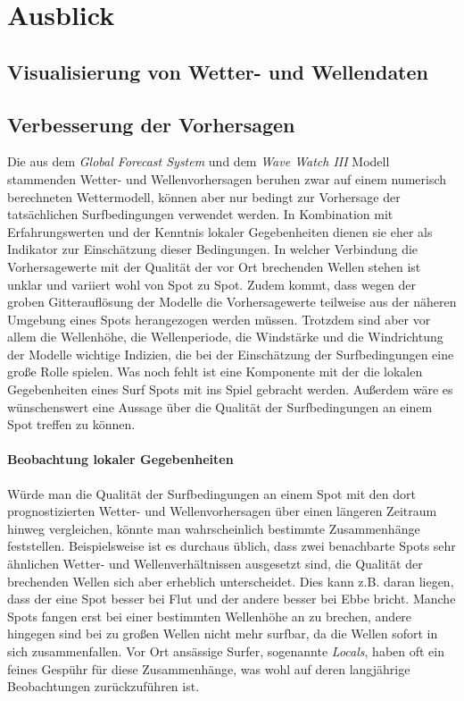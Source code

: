\chapter{Ausblick}

\section{Visualisierung von Wetter- und Wellendaten}

\section{Verbesserung der Vorhersagen}
Die aus dem \textit{Global Forecast System} und dem \textit{Wave Watch
  III} Modell stammenden Wetter- und Wellenvorhersagen beruhen zwar
auf einem numerisch berechneten Wettermodell, können aber nur bedingt
zur Vorhersage der tatsächlichen Surfbedingungen verwendet werden. In
Kombination mit Erfahrungswerten und der Kenntnis lokaler
Gegebenheiten dienen sie eher als Indikator zur Einschätzung dieser
Bedingungen. In welcher Verbindung die Vorhersagewerte mit der
Qualität der vor Ort brechenden Wellen stehen ist unklar und variiert
wohl von Spot zu Spot. Zudem kommt, dass wegen der groben
Gitterauflösung der Modelle die Vorhersagewerte teilweise aus der
näheren Umgebung eines Spots herangezogen werden müssen. Trotzdem sind
aber vor allem die Wellenhöhe, die Wellenperiode, die Windstärke und
die Windrichtung der Modelle wichtige Indizien, die bei der
Einschätzung der Surfbedingungen eine große Rolle spielen. Was noch
fehlt ist eine Komponente mit der die lokalen Gegebenheiten eines Surf
Spots mit ins Spiel gebracht werden. Außerdem wäre es wünschenswert
eine Aussage über die Qualität der Surfbedingungen an einem Spot
treffen zu können.

\subsubsection{Beobachtung lokaler Gegebenheiten}
Würde man die Qualität der Surfbedingungen an einem Spot mit den dort
prognostizierten Wetter- und Wellenvorhersagen über einen längeren
Zeitraum hinweg vergleichen, könnte man wahrscheinlich bestimmte
Zusammenhänge feststellen. Beispielsweise ist es durchaus üblich, dass
zwei benachbarte Spots sehr ähnlichen Wetter- und Wellenverhältnissen
ausgesetzt sind, die Qualität der brechenden Wellen sich aber
erheblich unterscheidet. Dies kann z.B. daran liegen, dass der eine
Spot besser bei Flut und der andere besser bei Ebbe bricht. Manche
Spots fangen erst bei einer bestimmten Wellenhöhe an zu brechen,
andere hingegen sind bei zu großen Wellen nicht mehr surfbar, da die
Wellen sofort in sich zusammenfallen. Vor Ort ansässige Surfer,
sogenannte \textit{Locals}, haben oft ein feines Gespühr für diese
Zusammenhänge, was wohl auf deren langjährige Beobachtungen
zurückzuführen ist.

